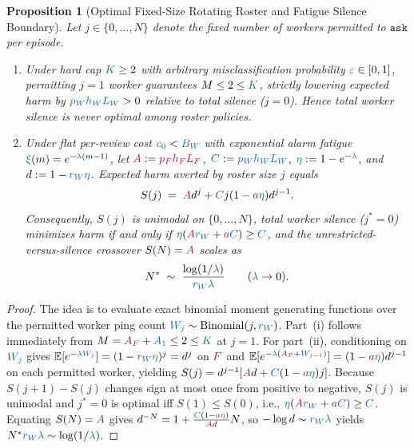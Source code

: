 \documentclass[11pt,reqno]{amsart}
\theoremstyle{spacious}
\newtheorem{proposition}{Proposition}[section]
\newcommand{\Wtxt}[1]{\textcolor{colW}{#1}}
\newcommand{\Wv}[1]{{\color{colW}#1}}
\newcommand{\Fv}[1]{{\color{colF}#1}}
\newcommand{\Hv}[1]{{\color{colH}#1}}
\newcommand{\E}{\mathbb{E}}
\newcommand{\ask}{\mathtt{ask}}
\begin{document}
\begin{proposition}[Optimal Fixed-Size Rotating Roster and Fatigue Silence Boundary]
\label{prop:roster}
Let $j \in \{0,\dots,N\}$ denote the fixed number of \Wtxt{workers} permitted to $\ask$ per episode.
\begin{enumerate}
  \setlength{\itemsep}{4pt}
  \item[(i)] Under hard cap $\Hv{K} \ge 2$ with arbitrary misclassification probability $\Hv{\varepsilon} \in [0,1]$, permitting $j = 1$ \Wtxt{worker} guarantees $M \le 2 \le \Hv{K}$, strictly lowering expected harm by $\Wv{p_W h_W L_W} > 0$ relative to total silence ($j = 0$). Hence total \Wtxt{worker} silence is never optimal among roster policies.
  \item[(ii)] Under flat per-review cost $\Hv{c_0} < \Wv{B_W}$ with exponential alarm fatigue $\Hv{\xi}(m) = e^{-\Hv{\lambda}(m-1)}$, let $\Fv{A} := \Fv{p_F h_F L_F}$, $\Wv{C} := \Wv{p_W h_W L_W}$, $\Hv{\eta} := 1 - e^{-\Hv{\lambda}}$, and $d := 1 - \Wv{r_W} \Hv{\eta}$. Expected harm averted by roster size $j$ equals
  \[
    S(j) \;=\; \Fv{A} d^j + \Wv{C} j (1 - \Fv{a}\Hv{\eta}) d^{j-1}.
  \]
  Consequently, $S(j)$ is unimodal on $\{0,\dots,N\}$, total \Wtxt{worker} silence ($j^* = 0$) minimizes harm if and only if $\Hv{\eta} (\Fv{A} \Wv{r_W} + \Fv{a} \Wv{C}) \ge \Wv{C}$, and the unrestricted-versus-silence crossover $S(N) = \Fv{A}$ scales as
  \[
    N^* \;\sim\; \frac{\log(1/\Hv{\lambda})}{\Wv{r_W} \Hv{\lambda}} \qquad (\Hv{\lambda} \to 0).
  \]
\end{enumerate}
\end{proposition}

\begin{proof}
The idea is to evaluate exact binomial moment generating functions over the permitted \Wtxt{worker} ping count $\Wv{W_j} \sim \mathrm{Binomial}(j, \Wv{r_W})$. Part~(i) follows immediately from $M = \Fv{A_F} + \Wv{A_1} \le 2 \le \Hv{K}$ at $j=1$. For part~(ii), conditioning on $\Wv{W_j}$ gives $\E[e^{-\Hv{\lambda} \Wv{W_j}}] = (1 - \Wv{r_W}\Hv{\eta})^j = d^j$ on $\Fv{F}$ and $\E[e^{-\Hv{\lambda}(\Fv{A_F} + \Wv{W_{j-1}})}] = (1 - \Fv{a}\Hv{\eta}) d^{j-1}$ on each permitted \Wtxt{worker}, yielding $S(j) = d^{j-1}[\Fv{A} d + \Wv{C}(1 - \Fv{a}\Hv{\eta}) j]$. Because $S(j+1) - S(j)$ changes sign at most once from positive to negative, $S(j)$ is unimodal and $j^* = 0$ is optimal iff $S(1) \le S(0)$, i.e., $\Hv{\eta}(\Fv{A} \Wv{r_W} + \Fv{a} \Wv{C}) \ge \Wv{C}$. Equating $S(N) = \Fv{A}$ gives $d^{-N} = 1 + \frac{\Wv{C}(1 - \Fv{a}\Hv{\eta})}{\Fv{A} d} N$, so $-\log d \sim \Wv{r_W}\Hv{\lambda}$ yields $N^* \Wv{r_W}\Hv{\lambda} \sim \log(1/\Hv{\lambda})$.
\end{proof}
\end{document}
